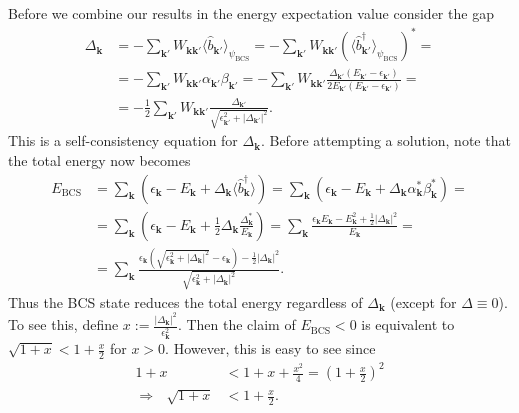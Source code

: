 \documentclass[english, parskip=full]{scrartcl}
\renewcommand{\bra}{}
\newcommand{\kla}{}
\newcommand{\tecxt}{}
\begin{document}
Before we combine our results in the energy expectation value consider the gap
\begin{align}
\Delta_\textbf{k} &= -\sum_{\textbf{k}'} W_{\textbf{k}\textbf{k}'} \bra\langle \hat{b}_{\textbf{k}'} \rangle_{\psi_\tecxt\text{BCS}} = -\sum_{\textbf{k}'} W_{\textbf{k}\textbf{k}'} \kla\left( \bra\langle \hat{b}_{\textbf{k}'}^\dagger \rangle_{\psi_\tecxt\text{BCS}} \right)^\ast = \\
&= -\sum_{\textbf{k}'} W_{\textbf{k}\textbf{k}'} \alpha_{\textbf{k}'} \beta_{\textbf{k}'} = -\sum_{\mathbf{k}'} W_{\mathbf{k}\textbf{k}'} \frac{\Delta_{\mathbf{k}'} \kla\left( E_{\mathbf{k}'} - \epsilon_{\mathbf{k}'} \right)}{2E_{\mathbf{k}'} (E_{\mathbf{k}'} - \epsilon_{\mathbf{k}'})} = \\
&= -\frac{1}{2}\sum_{\mathbf{k}'} W_{\mathbf{k}\textbf{k}'} \frac{\Delta_{\mathbf{k}'}}{\sqrt{\epsilon_{\mathbf{k}'}^2 + |\Delta_{\mathbf{k}'}|^2}}.
\end{align}
This is a self-consistency equation for $\Delta_\textbf{k}$.
Before attempting a solution, note that the total energy now becomes
\begin{align}
E_\tecxt\text{BCS} &= \sum_\textbf{k} \kla\left( \epsilon_\textbf{k} - E_\textbf{k} + \Delta_\textbf{k} \langle \hat{b}_{\mathbf{k}}^\dagger \rangle \right) = \sum_\textbf{k} \kla\left( \epsilon_\textbf{k} - E_\textbf{k} + \Delta_\textbf{k} \alpha_\textbf{k}^\ast \beta_\textbf{k}^\ast \right) = \\
&= \sum_\textbf{k} \kla\left( \epsilon_\textbf{k} - E_\textbf{k} + \frac{1}{2} \Delta_\textbf{k} \frac{\Delta_\textbf{k}^\ast}{E_\textbf{k}} \right) = \sum_\textbf{k} \frac{\epsilon_\textbf{k} E_\textbf{k} - E_\textbf{k}^2 + \frac{1}{2} |\Delta_\textbf{k}|^2}{E_\textbf{k}} = \\
&= \sum_\textbf{k} \frac{\epsilon_\textbf{k}\kla\left( \sqrt{\epsilon_\textbf{k}^2 + |\Delta_\textbf{k}|^2} - \epsilon_\textbf{k} \right) - \frac{1}{2}|\Delta_\textbf{k}|^2}{\sqrt{\epsilon_\textbf{k}^2 + |\Delta_\textbf{k}|^2}}.
\end{align}
Thus the BCS state reduces the total energy regardless of $\Delta_\textbf{k}$ (except for $\Delta\equiv 0$).
To see this, define $x := \frac{|\Delta_\textbf{k}|^2}{\epsilon_\textbf{k}^2}$.
Then the claim of $E_\tecxt\text{BCS} < 0$ is equivalent to $\sqrt{1 + x} < 1+\frac{x}{2}$ for $x>0$.
However, this is easy to see since
\begin{align}
1 + x &< 1+ x + \frac{x^2}{4} = \kla\left( 1 + \frac{x}{2} \right)^2\\
\Rightarrow\ \ \ \sqrt{1 + x} &< 1 + \frac{x}{2}.
\end{align}
\end{document}
